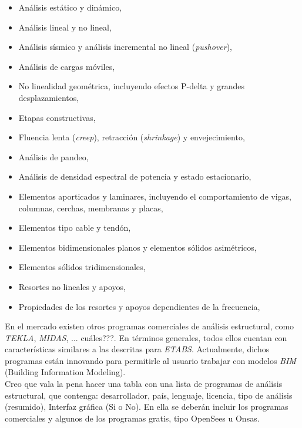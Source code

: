 \begin{itemize}
\item Análisis estático y dinámico,
\item Análisis lineal y no lineal,
\item Análisis sísmico y análisis incremental no lineal (\emph{pushover}),
\item Análisis de cargas móviles,
\item No linealidad geométrica, incluyendo efectos P-delta y grandes desplazamientos,
\item Etapas constructivas,
\item Fluencia lenta (\emph{creep}), retracción (\emph{shrinkage}) y envejecimiento,
\item Análisis de pandeo,
\item Análisis de densidad espectral de potencia y estado estacionario,
\item Elementos aporticados y laminares, incluyendo el comportamiento de vigas, columnas, cerchas, membranas y placas,
\item Elementos tipo cable y tendón,
\item Elementos bidimensionales planos y elementos sólidos asimétricos,
\item Elementos sólidos tridimensionales,
\item Resortes no lineales y apoyos,
\item Propiedades de los resortes y apoyos dependientes de la frecuencia,
\end{itemize}



\begin{nota}
En el mercado existen otros programas comerciales de análisis estructural, como \emph{TEKLA}, \emph{MIDAS}, {\color{red}... cuáles???}. En términos generales, todos ellos cuentan con características similares a las descritas para \emph{ETABS}. Actualmente, dichos programas están innovando para permitirle al usuario trabajar con modelos \emph{BIM} (Building Information Modeling).\\
\tcblower
  Creo que vala la pena hacer una tabla con una lista de programas de análisis estructural, que contenga: desarrollador, país, lenguaje, licencia, tipo de análisis (resumido), Interfaz gráfica (Si o No). En ella se deberán incluir los programas comerciales y algunos de los programas gratis, tipo OpenSees u Onsas.
\end{nota}

